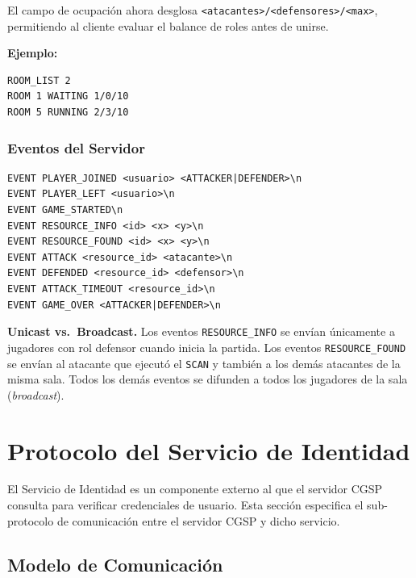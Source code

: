 \documentclass[12pt, letterpaper]{article}
\begin{document}
El campo de ocupación ahora desglosa \texttt{<atacantes>/<defensores>/<max>}, permitiendo al cliente evaluar el balance de roles antes de unirse.

\textbf{Ejemplo:}
\begin{lstlisting}
ROOM_LIST 2
ROOM 1 WAITING 1/0/10
ROOM 5 RUNNING 2/3/10
\end{lstlisting}

\subsubsection{Eventos del Servidor}

\begin{lstlisting}
EVENT PLAYER_JOINED <usuario> <ATTACKER|DEFENDER>\n
EVENT PLAYER_LEFT <usuario>\n
EVENT GAME_STARTED\n
EVENT RESOURCE_INFO <id> <x> <y>\n
EVENT RESOURCE_FOUND <id> <x> <y>\n
EVENT ATTACK <resource_id> <atacante>\n
EVENT DEFENDED <resource_id> <defensor>\n
EVENT ATTACK_TIMEOUT <resource_id>\n
EVENT GAME_OVER <ATTACKER|DEFENDER>\n
\end{lstlisting}

\begin{nota}
\textbf{Unicast vs.\ Broadcast.} Los eventos \texttt{RESOURCE\_INFO} se envían
únicamente a jugadores con rol defensor cuando inicia la partida. Los eventos \texttt{RESOURCE\_FOUND}
se envían al atacante que ejecutó el \texttt{SCAN} y también a los demás atacantes
de la misma sala. Todos los demás
eventos se difunden a todos los jugadores de la sala (\textit{broadcast}).
\end{nota}

\section{Protocolo del Servicio de Identidad}

\label{sec:identity}

El Servicio de Identidad es un componente externo al que el servidor CGSP consulta para
verificar credenciales de usuario. Esta sección especifica el sub-protocolo de
comunicación entre el servidor CGSP y dicho servicio.

\subsection{Modelo de Comunicación}
\end{document}

